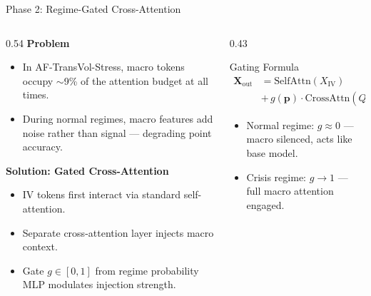 \documentclass[aspectratio=169,10pt]{beamer}
\begin{document}
\begin{frame}{Phase 2: Regime-Gated Cross-Attention}
  \begin{columns}[T]
    \begin{column}{0.54\textwidth}
      \textbf{Problem}
      \begin{itemize}\itemsep3pt
        \item In AF-TransVol-Stress, macro tokens occupy $\sim$9\% of the attention budget at all times.
        \item During normal regimes, macro features add noise rather than signal --- degrading point accuracy.
      \end{itemize}
      \vspace{4pt}
      \textbf{Solution: Gated Cross-Attention}
      \begin{itemize}\itemsep3pt
        \item IV tokens first interact via standard self-attention.
        \item Separate cross-attention layer injects macro context.
        \item Gate $g\in[0,1]$ from regime probability MLP modulates injection strength.
      \end{itemize}
    \end{column}
    \begin{column}{0.43\textwidth}
      \begin{block}{Gating Formula}
        \footnotesize
        \begin{align*}
          \mathbf{X}_\text{out}&=\text{SelfAttn}(X_\text{IV})\\
          &+\,g(\mathbf{p})\cdot\text{CrossAttn}(Q_\text{IV},K_m,V_m)
        \end{align*}
        \begin{itemize}\itemsep2pt
          \item Normal regime: $g\approx0$ --- macro silenced, acts like base model.
          \item Crisis regime: $g\to1$ --- full macro attention engaged.
        \end{itemize}
      \end{block}
    \end{column}
  \end{columns}
\end{frame}
\end{document}
